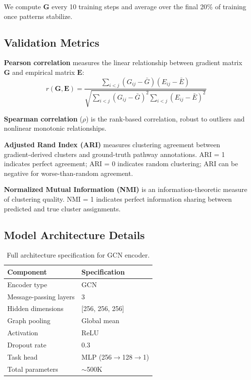 \documentclass{article}
\newcommand{\G}{\mathbf{G}}
\newcommand{\E}{\mathbf{E}}
\begin{document}
We compute $\G$ every 10 training steps and average over the final 20\% of training once patterns stabilize.

\subsection{Validation Metrics}

\textbf{Pearson correlation} measures the linear relationship between gradient matrix $\G$ and empirical matrix $\E$:
\begin{equation}
r(\G, \E) = \frac{\sum_{i<j}(G_{ij} - \bar{G})(E_{ij} - \bar{E})}{\sqrt{\sum_{i<j}(G_{ij} - \bar{G})^2 \sum_{i<j}(E_{ij} - \bar{E})^2}}
\end{equation}

\textbf{Spearman correlation} ($\rho$) is the rank-based correlation, robust to outliers and nonlinear monotonic relationships.

\textbf{Adjusted Rand Index (ARI)} measures clustering agreement between gradient-derived clusters and ground-truth pathway annotations. ARI = 1 indicates perfect agreement; ARI = 0 indicates random clustering; ARI can be negative for worse-than-random agreement.

\textbf{Normalized Mutual Information (NMI)} is an information-theoretic measure of clustering quality. NMI = 1 indicates perfect information sharing between predicted and true cluster assignments.

\subsection{Model Architecture Details}

\begin{table}[H]
\caption{Full architecture specification for GCN encoder.}
\begin{center}
\begin{tabular}{@{}ll@{}}
\toprule
Component & Specification \\
\midrule
Encoder type & GCN \\
Message-passing layers & 3 \\
Hidden dimensions & [256, 256, 256] \\
Graph pooling & Global mean \\
Activation & ReLU \\
Dropout rate & 0.3 \\
Task head & MLP (256$\to$128$\to$1) \\
Total parameters & $\sim$500K \\
\bottomrule
\end{tabular}
\end{center}
\vspace{-2mm}
\end{table}
\vspace{-2mm}
\end{document}
